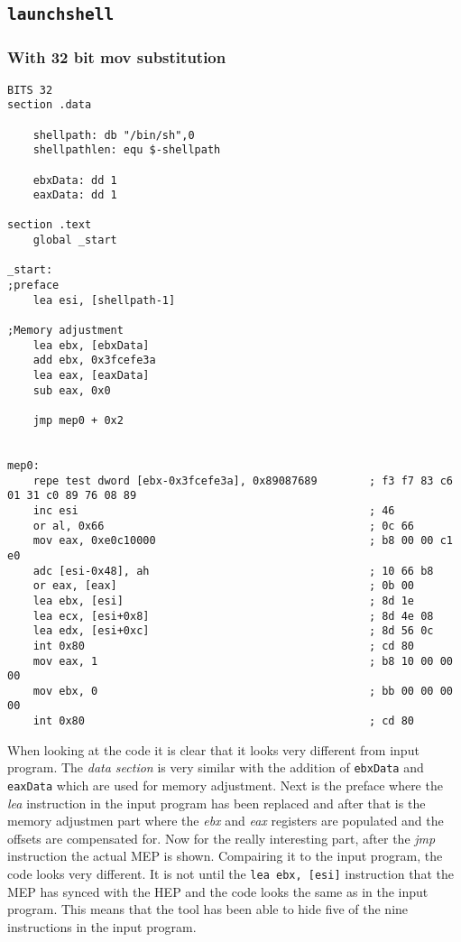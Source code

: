 \documentclass[11pt,twoside]{eitExjobb}
\begin{document}
\subsection{\texttt{launchshell}}
\subsubsection{With 32 bit mov substitution}

\begin{Verbatim}[fontsize=\tiny]
BITS 32
section .data

    shellpath: db "/bin/sh",0
    shellpathlen: equ $-shellpath

    ebxData: dd 1
    eaxData: dd 1

section .text
    global _start

_start:
;preface
    lea esi, [shellpath-1]

;Memory adjustment
    lea ebx, [ebxData]
    add ebx, 0x3fcefe3a
    lea eax, [eaxData]
    sub eax, 0x0

    jmp mep0 + 0x2


mep0:
    repe test dword [ebx-0x3fcefe3a], 0x89087689        ; f3 f7 83 c6 01 31 c0 89 76 08 89
    inc esi                                             ; 46
    or al, 0x66                                         ; 0c 66 
    mov eax, 0xe0c10000                                 ; b8 00 00 c1 e0
    adc [esi-0x48], ah                                  ; 10 66 b8
    or eax, [eax]                                       ; 0b 00
    lea ebx, [esi]                                      ; 8d 1e
    lea ecx, [esi+0x8]                                  ; 8d 4e 08
    lea edx, [esi+0xc]                                  ; 8d 56 0c
    int 0x80                                            ; cd 80
    mov eax, 1                                          ; b8 10 00 00 00
    mov ebx, 0                                          ; bb 00 00 00 00
    int 0x80                                            ; cd 80
\end{Verbatim}

\noindent When looking at the code it is clear that it looks very different from input program. The \emph{data section} is very similar with the addition of \texttt{ebxData} and \texttt{eaxData} which are used for memory adjustment. Next is the preface where the \emph{lea} instruction in the input program has been replaced and after that is the memory adjustmen part where the \emph{ebx} and \emph{eax} registers are populated and the offsets are compensated for. Now for the really interesting part, after the \emph{jmp} instruction the actual MEP is shown. Compairing it to the input program, the code looks very different. It is not until the \texttt{lea ebx, [esi]} instruction that the MEP has synced with the HEP and the code looks the same as in the input program. This means that the tool has been able to hide five of the nine instructions in the input program.
\end{document}
